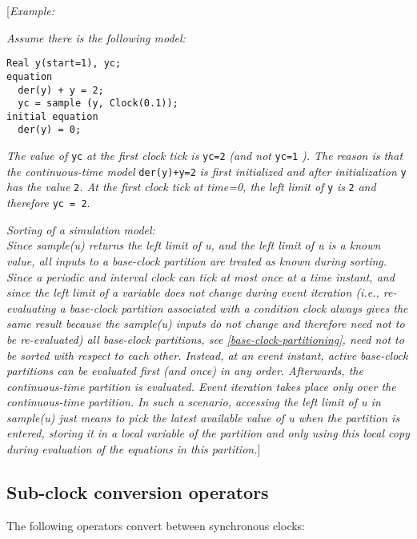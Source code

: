 {[}\emph{Example: }

\emph{Assume there is the following model:}

\begin{lstlisting}[language=modelica]
  Real y(start=1), yc;
equation
  der(y) + y = 2;
  yc = sample (y, Clock(0.1));
initial equation
  der(y) = 0;

\end{lstlisting}
\emph{The value of} \lstinline!yc! \emph{at the first clock tick is} \lstinline!yc=2! \emph{(and not} \lstinline!yc=1! \emph{).
The reason is that the continuous-time model} \lstinline!der(y)+y=2! \emph{ is first
initialized and after initialization} \lstinline!y! \emph{has the value} \lstinline!2!\emph{. At the first
clock tick at time=0, the left limit of} \lstinline!y! \emph{is} \lstinline!2! \emph{and therefore} \lstinline!yc = 2!.

\emph{Sorting of a simulation model:\\
Since sample(u) returns the left limit of u, and the left limit of u is
a known value, all inputs to a base-clock partition are treated as known
during sorting. Since a periodic and interval clock can tick at most
once at a time instant, and since the left limit of a variable does not
change during event iteration (i.e., re-evaluating a base-clock
partition associated with a condition clock always gives the same result
because the sample(u) inputs do not change and therefore need not to be
re-evaluated) all base-clock partitions, see \autoref{base-clock-partitioning}, need
not to be sorted with respect to each other. Instead, at an event
instant, active base-clock partitions can be evaluated first (and once)
in any order. Afterwards, the continuous-time partition is evaluated.
Event iteration takes place only over the continuous-time partition. In
such a scenario, accessing the left limit of u in sample(u) just means
to pick the latest available value of u when the partition is entered,
storing it in a local variable of the partition and only using this
local copy during evaluation of the equations in this partition.}{]}

\subsection{Sub-clock conversion operators}

The following operators convert between synchronous clocks:

